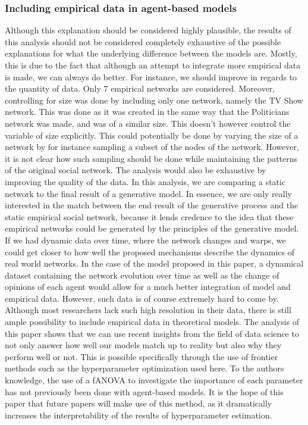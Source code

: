 \documentclass{article}
\begin{document}
\subsubsection{Including empirical data in agent-based models}
Although this explanation should be considered highly plausible, the results of this analysis should not be considered completely exhaustive of the possible explanations for what the underlying difference between the models are.
Mostly, this is due to the fact that although an attempt to integrate more empirical data is made, we can always do better. 
For instance, we should improve in regards to the quantity of data. Only 7 empirical networks are considered. Moreover, controlling for size was done by including only one network, namely the TV Show network. This was done as it was created in the same way that the Politicians network was made, and was of a similar size. 
This doesn't however control the variable of size explicitly. This could potentially be done by varying the size of a network by for instance sampling a subset of the nodes of the network. However, it is not clear how such sampling should be done while maintaining the patterns of the original social network. 
The analysis would also be exhaustive by improving the quality of the data. In this analysis, we are comparing a static network to the final result of a generative model. In essence, we are only really interested in the match between the end result of the generative process and the static empirical social network, because it lends credence to the idea that these empirical networks could be generated by the principles of the generative model. 
If we had dynamic data over time, where the network changes and warps, we could get closer to how well the proposed mechanisms describe the dynamics of real world networks. In the case of the model proposed in this paper, a dynamical dataset containing the network evolution over time as well as the change of opinions of each agent would allow for a much better integration of model and empirical data. 
However, such data is of course extremely hard to come by. Although most researchers lack such high resolution in their data, there is still ample possibility to include empirical data in theoretical models. 
The analysis of this paper shows that we can use recent insights from the field of data science to not only answer how well our models match up to reality but also why they perform well or not. 
This is possible specifically through the use of frontier methods such as the hyperparameter optimization used here. To the authors knowledge, the use of a fANOVA to investigate the importance of each parameter has not previously been done with agent-based models.
It is the hope of this paper that future papers will make use of this method, as it dramatically increases the interpretability of the results of hyperparameter estimation.
\end{document}
